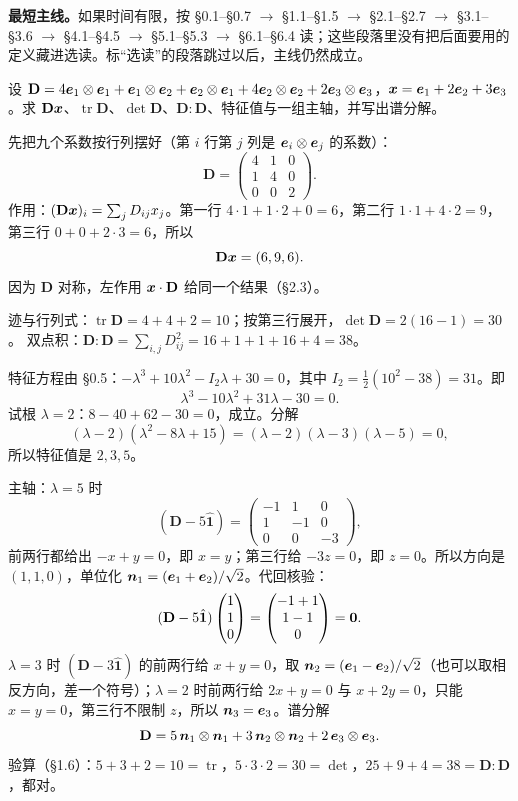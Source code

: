 \documentclass[11pt]{ctexart}
\newcommand{\ten}[1]{\mathbf{#1}}
\newcommand{\unitd}{\hat{\ten{1}}}
\newcommand{\tr}{\operatorname{tr}}
\let\orighdr\hdr
\renewcommand{\hdr}[2]{\par\needspace{10\baselineskip}\orighdr{#1}{#2}}
\begin{document}
\textbf{最短主线。}如果时间有限，按 \S0.1--\S0.7 $\to$ \S1.1--\S1.5 $\to$ \S2.1--\S2.7 $\to$ \S3.1--\S3.6 $\to$ \S4.1--\S4.5 $\to$ \S5.1--\S5.3 $\to$ \S6.1--\S6.4 读；这些段落里没有把后面要用的定义藏进选读。标“选读”的段落跳过以后，主线仍然成立。

\clearpage
\appendix
{}
\label{app:solutions}

{设 $\ten D=4\vect e_1\otimes\vect e_1+\vect e_1\otimes\vect e_2+\vect e_2\otimes\vect e_1+4\vect e_2\otimes\vect e_2+2\vect e_3\otimes\vect e_3$，$\boldsymbol{x}=\boldsymbol{e}_1+2\boldsymbol{e}_2+3\boldsymbol{e}_3$。求 $\ten D\vect x$、$\tr\ten D$、$\det\ten D$、$\ten D:\ten D$、特征值与一组主轴，并写出谱分解。}

先把九个系数按行列摆好（第 $i$ 行第 $j$ 列是 $\boldsymbol{e}_i\otimes\boldsymbol{e}_j$ 的系数）：
\[
\ten D=\begin{pmatrix}4&1&0\\1&4&0\\0&0&2\end{pmatrix}.
\]
作用：$(\ten D\vect x)_i=\sum_jD_{ij}x_j$。第一行 $4\cdot1+1\cdot2+0=6$，第二行 $1\cdot1+4\cdot2=9$，第三行 $0+0+2\cdot3=6$，所以
\[
\ten D\vect x=(6,9,6).
\]
因为 $\ten D$ 对称，左作用 $\vect x\cdot\ten D$ 给同一个结果（\S2.3）。

迹与行列式：$\tr\ten D=4+4+2=10$；按第三行展开，$\det\ten D=2(16-1)=30$。
双点积：$\ten D:\ten D=\sum_{i,j}D_{ij}^2=16+1+1+16+4=38$。

特征方程由 \S0.5：$-\lambda^3+10\lambda^2-I_2\lambda+30=0$，其中 $I_2=\frac12(10^2-38)=31$。即
\[
\lambda^3-10\lambda^2+31\lambda-30=0 .
\]
试根 $\lambda=2$：$8-40+62-30=0$，成立。分解
\[
(\lambda-2)(\lambda^2-8\lambda+15)=(\lambda-2)(\lambda-3)(\lambda-5)=0,
\]
所以特征值是 $2,3,5$。

主轴：$\lambda=5$ 时
\[
(\ten D-5\unitd)=\begin{pmatrix}-1&1&0\\1&-1&0\\0&0&-3\end{pmatrix},
\]
前两行都给出 $-x+y=0$，即 $x=y$；第三行给 $-3z=0$，即 $z=0$。所以方向是 $(1,1,0)$，单位化 $\boldsymbol{n}_1=(\boldsymbol{e}_1+\boldsymbol{e}_2)/\sqrt2$。代回核验：
\[
(\ten D-5\unitd)\begin{pmatrix}1\\1\\0\end{pmatrix}
=\begin{pmatrix}-1+1\\1-1\\0\end{pmatrix}=\vect0 .
\]
$\lambda=3$ 时 $(\ten D-3\unitd)$ 的前两行给 $x+y=0$，取 $\boldsymbol{n}_2=(\boldsymbol{e}_1-\boldsymbol{e}_2)/\sqrt2$（也可以取相反方向，差一个符号）；$\lambda=2$ 时前两行给 $2x+y=0$ 与 $x+2y=0$，只能 $x=y=0$，第三行不限制 $z$，所以 $\boldsymbol{n}_3=\boldsymbol{e}_3$。谱分解
\[
\ten D=5\,\vect n_1\otimes\vect n_1+3\,\vect n_2\otimes\vect n_2+2\,\vect e_3\otimes\vect e_3 .
\]
验算（\S1.6）：$5+3+2=10=\tr$，$5\cdot3\cdot2=30=\det$，$25+9+4=38=\ten D:\ten D$，都对。
\end{document}
